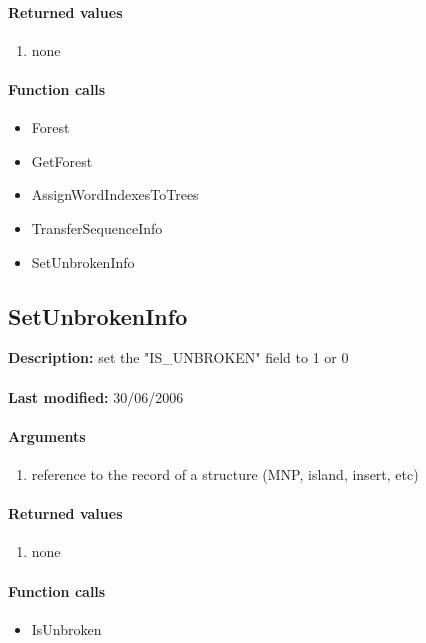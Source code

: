 \paragraph{Returned values}
\begin{enumerate}
\item none
\end{enumerate}

\paragraph{Function calls}
\begin{itemize}
\item Forest
\item GetForest
\item AssignWordIndexesToTrees
\item TransferSequenceInfo
\item SetUnbrokenInfo
\end{itemize}

\subsection{SetUnbrokenInfo}
\textbf{Description:} set the "IS\_UNBROKEN" field to 1 or 0\\
\\\textbf{Last modified:} 30/06/2006

\paragraph{Arguments}
\begin{enumerate}
\item reference to the record of a structure (MNP, island, insert, etc)
\end{enumerate}

\paragraph{Returned values}
\begin{enumerate}
\item none
\end{enumerate}

\paragraph{Function calls}
\begin{itemize}
\item IsUnbroken
\end{itemize}


